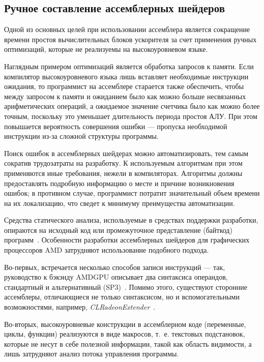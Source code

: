 \documentclass[a4paper,14pt]{extarticle}
\begin{document}
{\subsection{Ручное составление ассемблерных шейдеров}

Одной из основных целей при использовании ассемблера является сокращение времени
простоя вычислительных блоков ускорителя за счет применения ручных оптимизаций,
которые не реализуемы на высокоуровневом языке.

Наглядным примером оптимизаций является обработка запросов к памяти. Если
компилятор высокоуровневого языка лишь вставляет необходимые инструкции ожидания,
то программист на ассемблере старается также обеспечить, чтобы между запросом к памяти
и ожиданием было как можно больше несвязанных арифметических операций,
а ожидаемое значение счетчика было как можно более точным, поскольку
это уменьшает длительность периода простоя АЛУ. При этом повышается вероятность совершения
ошибки — пропуска необходимой инструкции из-за сложной структуры программы.

Поиск ошибок в ассемблерных шейдерах можно автоматизировать, тем самым сократив
трудозатраты на разработку. К используемым алгоритмам при этом применяются иные требования,
нежели в компиляторах. Алгоритмы должны предоставлять подробную информацию о месте
и причине возникновения ошибок; в противном случае, программист потратит значительный
объем времени на их локализацию, что сведет к минимуму преимущества автоматизации.

Средства статического анализа, используемые в средствах поддержки разработки,
опираются на исходный код или промежуточное представление (байткод)
программ~\cite{static-code-analysis}. Особенности разработки ассемблерных шейдеров
для графических процессоров AMD затрудняют использование подобного подхода.

Во-первых, встречается несколько способов записи инструкций — так, руководство к бэкэнду
AMDGPU описывает два синтаксиса операндов, стандартный и альтернативный (SP3)~\cite{gcn-asm-syntax}.
Помимо этого, существуют сторонние ассемблеры, отличающиеся не только синтаксисом,
но и вспомогательными возможностями, например, \textit{CLRadeonExtender}~\cite{clrx}.

Во-вторых, высокоуровневые конструкции в ассемблерном коде (переменные, циклы, функции)
реализуются в виде макросов, т.~е. текстовых подстановок, которые не несут в себе полезной
информации, такой как область видимости, а лишь затрудняют анализ потока управления программы.

}
\end{document}
